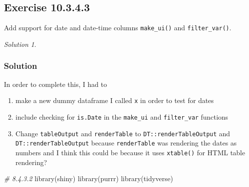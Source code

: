 \documentclass[
]{book}
\newenvironment{Shaded}{\begin{snugshade}}{\end{snugshade}}
\newcommand{\CommentTok}[1]{\textcolor[rgb]{0.56,0.35,0.01}{\textit{#1}}}
\newcommand{\FunctionTok}[1]{\textcolor[rgb]{0.00,0.00,0.00}{#1}}
\newcommand{\NormalTok}[1]{#1}
\providecommand{\tightlist}{%
  \setlength{\itemsep}{0pt}\setlength{\parskip}{0pt}}
\theoremstyle{definition}
\theoremstyle{definition}
\theoremstyle{definition}
\theoremstyle{definition}
\theoremstyle{remark}
\newtheorem*{solution}{Solution}
\begin{document}
\hypertarget{exercise-10.3.4.3}{%
\subsection*{Exercise 10.3.4.3}\label{exercise-10.3.4.3}}

Add support for date and date-time columns \texttt{make\_ui()} and \texttt{filter\_var()}.

\begin{solution}
\leavevmode

\hypertarget{solution-38}{%
\subsubsection*{Solution}\label{solution-38}}

In order to complete this, I had to

\begin{enumerate}
\def\labelenumi{\arabic{enumi})}
\tightlist
\item
  make a new dummy dataframe I called \texttt{x} in order to test for dates
\item
  include checking for \texttt{is.Date} in the \texttt{make\_ui} and \texttt{filter\_var} functions
\item
  Change \texttt{tableOutput} and \texttt{renderTable} to \texttt{DT::renderTableOutput} and \texttt{DT::renderTableOutput} because \texttt{renderTable} was rendering the dates as numbers and I think this could be because it uses \texttt{xtable()} for HTML table rendering?
\end{enumerate}

\begin{Shaded}
\begin{Highlighting}[]
\CommentTok{\# 8.4.3.2}
\FunctionTok{library}\NormalTok{(shiny)}
\FunctionTok{library}\NormalTok{(purrr)}
\FunctionTok{library}\NormalTok{(tidyverse)}


\end{Highlighting}
\end{Shaded}
\end{solution}
\end{document}
